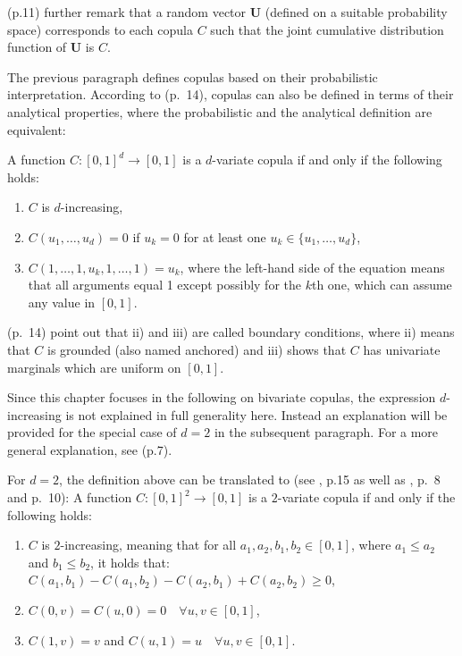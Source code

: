 \documentclass[
]{krantz}
\begin{document}
\citet{durante2016} (p.11) further remark that a random vector \(\mathbf{U}\) (defined on a suitable probability space) corresponds to each copula \(C\) such that the joint cumulative distribution function of \(\mathbf{U}\) is \(C\).

The previous paragraph defines copulas based on their probabilistic interpretation. According to \citet{durante2016} (p.~14), copulas can also be defined in terms of their analytical properties, where the probabilistic and the analytical definition are equivalent:

A function \(C: [0,1]^d \to [0,1]\) is a \(d\)-variate copula if and only if the following holds:

\begin{enumerate}
\def\labelenumi{\roman{enumi})}
\item
  \(C\) is \(d\)-increasing,
\item
  \(C(u_1, \ldots,u_d) = 0\) if \(u_k = 0\) for at least one \(u_k \in \{u_1, \ldots, u_d\}\),
\item
  \(C(1, \ldots, 1, u_k, 1, \ldots, 1) = u_k\), where the left-hand side of the equation means that all arguments equal 1 except possibly for the \(k\)th one, which can assume any value in \([0,1]\).
\end{enumerate}

\citet{durante2016} (p.~14) point out that ii) and iii) are called boundary conditions, where ii) means that \(C\) is grounded (also named anchored) and iii) shows that \(C\) has univariate marginals which are uniform on \([0,1]\).

Since this chapter focuses in the following on bivariate copulas, the expression \(d\)-increasing is not explained in full generality here. Instead an explanation will be provided for the special case of \(d=2\) in the subsequent paragraph. For a more general explanation, see \citet{durante2016} (p.7).

For \(d=2\), the definition above can be translated to (see \citet{durante2016}, p.15 as well as \citet{nelsen2006}, p.~8 and p.~10): A function \(C: [0,1]^2 \to [0,1]\) is a \(2\)-variate copula if and only if the following holds:

\begin{enumerate}
\def\labelenumi{\roman{enumi})}
\item
  \(C\) is \(2\)-increasing, meaning that for all \(a_1, a_2, b_1, b_2 \in [0,1]\), where \(a_1 \leq a_2\) and \(b_1 \leq b_2\), it holds that:
  \(C(a_1, b_1) - C(a_1, b_2) - C(a_2, b_1) + C(a_2, b_2) \geq 0\),
\item
  \(C(0,v) = C(u,0) = 0 \quad \forall u,v \in [0,1]\),
\item
  \(C(1,v) = v\) and \(C(u,1) = u \quad \forall u,v \in [0,1]\).
\end{enumerate}
\end{document}
